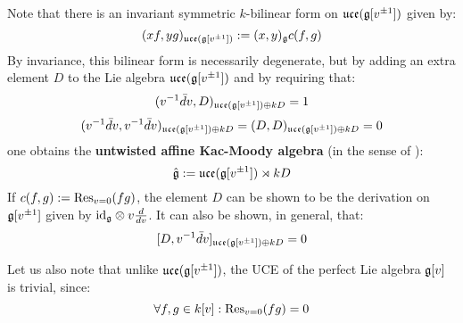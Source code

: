 \begin{example}
            Note that there is an invariant symmetric $k$-bilinear form on $\mathfrak{uce}(\mathfrak{g}[v^{\pm 1}])$ given by:
                $$(x f, y g)_{\mathfrak{uce}(\mathfrak{g}[v^{\pm 1}])} := (x, y)_{\mathfrak{g}} c(f, g)$$
            By invariance, this bilinear form is necessarily degenerate, but by adding an extra element $D$ to the Lie algebra $\mathfrak{uce}(\mathfrak{g}[v^{\pm 1}])$ and by requiring that:
                $$(v^{-1} \bar{d}v, D)_{\mathfrak{uce}(\mathfrak{g}[v^{\pm 1}]) \oplus k D} = 1$$
                $$(v^{-1} \bar{d}v, v^{-1} \bar{d}v)_{\mathfrak{uce}(\mathfrak{g}[v^{\pm 1}]) \oplus k D} = (D, D)_{\mathfrak{uce}(\mathfrak{g}[v^{\pm 1}]) \oplus k D} = 0$$
            one obtains the \textbf{untwisted affine Kac-Moody algebra} (in the sense of \cite[Chapter 7]{kac_infinite_dimensional_lie_algebras}):
                $$\hat{\mathfrak{g}} := \mathfrak{uce}(\mathfrak{g}[v^{\pm 1}]) \rtimes k D$$
            If $c(f, g) := \mathrm{Res}_{v = 0}(fg)$, the element $D$ can be shown to be the derivation on $\mathfrak{g}[v^{\pm 1}]$ given by $\id_{\g} \tensor v \frac{d}{dv}$. It can also be shown, in general, that:
                $$[D, v^{-1} \bar{d}v]_{\mathfrak{uce}(\mathfrak{g}[v^{\pm 1}]) \oplus k D} = 0$$

            Let us also note that unlike $\mathfrak{uce}(\mathfrak{g}[v^{\pm 1}])$, the UCE of the perfect Lie algebra $\mathfrak{g}[v]$ is trivial, since:
                $$\forall f, g \in k[v]: \mathrm{Res}_{v = 0}(fg) = 0$$
        \end{example}
